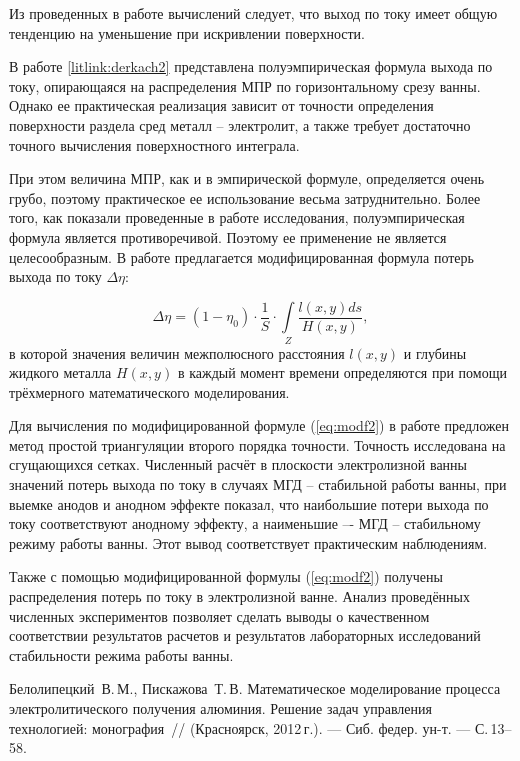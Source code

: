 \begin{vkrthesis}
Из проведенных в работе вычислений следует, что выход по току имеет общую тенденцию на уменьшение при искривлении поверхности. 

В работе \ref{litlink:derkach2} представлена полуэмпирическая формула выхода по току, опирающаяся на распределения МПР по горизонтальному срезу ванны.
Однако ее практическая реализация зависит от точности определения поверхности раздела сред металл -- электролит, а также требует достаточно точного вычисления поверхностного интеграла. 

При этом величина МПР, как и в эмпирической формуле, определяется очень грубо, поэтому практическое ее использование весьма затруднительно. Более того, как показали проведенные в работе исследования, полуэмпирическая формула является противоречивой. Поэтому ее применение не является целесообразным.
В работе предлагается модифицированная формула потерь выхода по току $\Delta \eta$:

\vspace{-2em}
\begin{equation} \label{eq:modf2}
\Delta \eta = (1- \eta_0) \cdot \frac{1}{S} \cdot \int\limits_Z \frac{l(x,y) ds}{H(x,y)},
\end{equation}
в которой значения величин межполюсного расстояния $l(x,y)$ и глубины жидкого металла $ H(x,y)$ в каждый момент времени определяются при помощи трёхмерного математического моделирования.

Для вычисления по модифицированной формуле (\ref{eq:modf2}) в работе предложен метод простой триангуляции второго порядка точности. Точность исследована на сгущающихся сетках.
Численный расчёт в плоскости электролизной ванны значений потерь выхода по току в случаях МГД -- стабильной работы ванны, при выемке анодов и анодном эффекте показал, что наибольшие потери выхода по току соответствуют анодному эффекту, а наименьшие –- МГД -- стабильному режиму работы ванны. Этот вывод соответствует практическим наблюдениям.

Также с помощью модифицированной формулы (\ref{eq:modf2}) получены распределения потерь по току в электролизной ванне. Анализ проведённых численных экспериментов позволяет сделать выводы о качественном соответствии результатов расчетов и результатов лабораторных исследований стабильности режима работы ванны.

\begin{vkrreferences}

\item
\label{litlink:belo}
Белолипецкий~В.\,М., Пискажова~Т.\,В.
Математическое моделирование процесса электролитического получения алюминия. Решение задач управления технологией: монография~//
(Красноярск, 2012\,г.). --- Сиб. федер. ун-т. ---
С.\,13--58.


\end{vkrreferences}
\end{vkrthesis}
